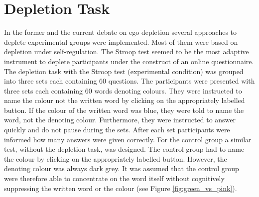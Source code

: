\FloatBarrier

\section{Depletion Task}
In the former \citep{muraven1998self,baumeister2002yielding} and the current \citep{unger2011ego,pocheptsova2009deciding} debate on ego depletion several approaches to deplete experimental groups were implemented. Most of them were based on depletion under self-regulation. The Stroop test \citep{stroop1935studies} seemed to be the most adaptive instrument to deplete participants under the construct of an online questionnaire. The depletion task with the Stroop test (experimental condition) was grouped into three sets each containing 60 questions. The participants were presented with three sets each containing 60 words denoting colours. They were instructed to name the colour not the written word by clicking on the appropriately labelled button. If the colour of the written word was blue, they were told to name the word, not the denoting colour. Furthermore, they were instructed to answer quickly and do not pause during the sets. After each set participants were informed how many answers were given correctly. For the control group a similar test, without the depletion task, was designed. The control group had to name the colour by clicking on the appropriately labelled button. However, the denoting colour was always dark grey. It was assumed that the control group were therefore able to concentrate on the word itself without cognitively suppressing the written word or the colour (see Figure \ref{fig:green_vs_pink}). 

